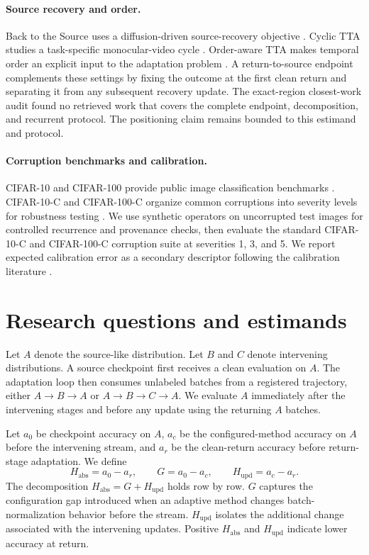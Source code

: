 \documentclass[11pt]{article}
\newcommand{\Habs}{\ensuremath{H_{\mathrm{abs}}}}
\newcommand{\Hupd}{\ensuremath{H_{\mathrm{upd}}}}
\newcommand{\A}{\ensuremath{A}}
\newcommand{\B}{\ensuremath{B}}
\newcommand{\C}{\ensuremath{C}}
\begin{document}
\paragraph{Source recovery and order.}
Back to the Source uses a diffusion-driven source-recovery objective \citep{source}. Cyclic TTA studies a task-specific monocular-video cycle \citep{cyclic}. Order-aware TTA makes temporal order an explicit input to the adaptation problem \citep{order}. A return-to-source endpoint complements these settings by fixing the outcome at the first clean return and separating it from any subsequent recovery update. The exact-region closest-work audit found no retrieved work that covers the complete endpoint, decomposition, and recurrent protocol. The positioning claim remains bounded to this estimand and protocol.

\paragraph{Corruption benchmarks and calibration.}
CIFAR-10 and CIFAR-100 provide public image classification benchmarks \citep{cifar}. CIFAR-10-C and CIFAR-100-C organize common corruptions into severity levels for robustness testing \citep{cifarcorrupt}. We use synthetic operators on uncorrupted test images for controlled recurrence and provenance checks, then evaluate the standard CIFAR-10-C and CIFAR-100-C corruption suite at severities 1, 3, and 5. We report expected calibration error as a secondary descriptor following the calibration literature \citep{calibration}.

\section{Research questions and estimands}
\label{sec:estimands}

Let $\A$ denote the source-like distribution. Let $\B$ and $\C$ denote intervening distributions. A source checkpoint first receives a clean evaluation on $\A$. The adaptation loop then consumes unlabeled batches from a registered trajectory, either $\A\to\B\to\A$ or $\A\to\B\to\C\to\A$. We evaluate $\A$ immediately after the intervening stages and before any update using the returning $\A$ batches.

Let $a_0$ be checkpoint accuracy on $\A$, $a_c$ be the configured-method accuracy on $\A$ before the intervening stream, and $a_r$ be the clean-return accuracy before return-stage adaptation. We define
\begin{equation}
    \Habs = a_0-a_r, \qquad
    G = a_0-a_c, \qquad
    \Hupd = a_c-a_r.
\end{equation}
The decomposition $\Habs=G+\Hupd$ holds row by row. $G$ captures the configuration gap introduced when an adaptive method changes batch-normalization behavior before the stream. $\Hupd$ isolates the additional change associated with the intervening updates. Positive $\Habs$ and $\Hupd$ indicate lower accuracy at return.
\end{document}
